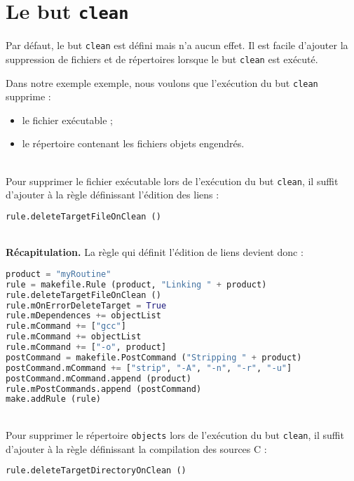 \documentclass[a4paper,12pt,obeyspaces,openany]{extarticle}
\begin{document}
\section{Le but \texttt{clean}}

Par défaut, le but \texttt{clean} est défini mais n'a aucun effet. Il est facile d'ajouter la suppression de fichiers et de répertoires lorsque le but \texttt{clean} est exécuté.

Dans notre exemple exemple, nous voulons que l'exécution du but \texttt{clean} supprime :
\begin{itemize}
  \item le fichier exécutable ;
  \item le répertoire contenant les fichiers objets engendrés.
\end{itemize}

~\\Pour supprimer le fichier exécutable lors de l'exécution du but \texttt{clean}, il suffit d'ajouter à la règle définissant l'édition des liens :

\begin{lstlisting}[language=py]
rule.deleteTargetFileOnClean ()
\end{lstlisting}


~\\{\bf Récapitulation.} La règle qui définit l'édition de liens devient donc :
\begin{lstlisting}[language=py]
product = "myRoutine"
rule = makefile.Rule (product, "Linking " + product)
rule.deleteTargetFileOnClean ()
rule.mOnErrorDeleteTarget = True
rule.mDependences += objectList
rule.mCommand += ["gcc"]
rule.mCommand += objectList
rule.mCommand += ["-o", product]
postCommand = makefile.PostCommand ("Stripping " + product)
postCommand.mCommand += ["strip", "-A", "-n", "-r", "-u"]
postCommand.mCommand.append (product)
rule.mPostCommands.append (postCommand)
make.addRule (rule)
\end{lstlisting}


~\\Pour supprimer le répertoire \texttt{objects} lors de l'exécution du but \texttt{clean}, il suffit d'ajouter à la règle définissant la compilation des sources C :

\begin{lstlisting}[language=py]
  rule.deleteTargetDirectoryOnClean ()
\end{lstlisting}
\end{document}
